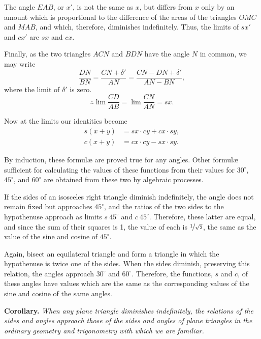\begin{description}
The angle $EAB$, or $x'$, is not the same as $x$, but differs from
$x$ only by an amount which is proportional to the difference of the
areas of the triangles $OMC$ and $MAB$, and which, therefore,
diminishes indefinitely. Thus, the limits of $sx'$ and $cx'$ are
$sx$ and $cx$.

Finally, as the two triangles $ACN$ and $BDN$ have the angle $N$ in
common, we may write
\begin{equation*}
\frac{DN}{BN} = \frac{CN + \delta '}{AN}
                                = \frac{CN - DN + \delta '}{AN - BN},
\end{equation*}
where the limit of $\delta'$ is zero.
\begin{equation*}
\therefore \lim \frac{CD}{AB} = \lim\frac{CN}{AN} = sx.
\end{equation*}

Now at the limits our identities become
\begin{align*}
s(x+y) &=  sx \cdot cy + cx \cdot sy, \\
c(x+y) &=  cx \cdot cy - sx \cdot sy.
\end{align*}

By induction, these formulæ are proved true for any angles. Other
formulæ sufficient for calculating the values of these functions
from their values for $30^\circ$, $45^\circ$, and $60^\circ$ are
obtained from these two by algebraic processes.

If the sides of an isosceles right triangle diminish indefinitely,
the angle does not remain fixed but approaches $45^\circ$, and the
ratios of the two sides to the hypothenuse approach as limits $s\
45^\circ$ and $c\ 45^\circ$. Therefore, these latter are equal, and
since the sum of their squares is 1, the value of each is
$\nicefrac{1}{\sqrt{2}}$, the same as the value of the sine and
cosine of $45^\circ$.

Again, bisect an equilateral triangle and form a triangle in which
the hypothenuse is twice one of the sides. When the sides diminish,
preserving this relation, the angles approach $30^\circ$ and
$60^\circ$. Therefore, the functions, $s$ and $c$, of these angles
have values which are the same as the corresponding values of the
sine and cosine of the same angles.

\textbf{Corollary.} \emph{When any plane triangle diminishes
indefinitely, the relations of the sides and angles approach those
of the sides and angles of plane triangles in the ordinary geometry
and trigonometry with which we are familiar.}


\end{description}
